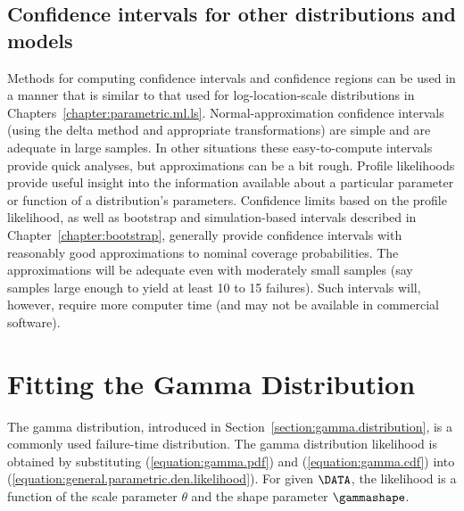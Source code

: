 \subsection{Confidence intervals for other distributions and models}
Methods for computing confidence intervals and confidence regions
can be used in a manner that is similar to that used for
log-location-scale distributions in
Chapters~\ref{chapter:parametric.ml.ls}.  Normal-approximation
confidence intervals (using the delta method and appropriate
transformations) are simple and are adequate in large samples.  In
other situations these easy-to-compute intervals provide quick
analyses, but approximations can be a bit rough. Profile likelihoods
provide useful insight into the information available about a
particular parameter or function of a distribution's parameters.
Confidence limits based on the profile likelihood, as well as
bootstrap and simulation-based intervals described in
Chapter~\ref{chapter:bootstrap}, generally provide confidence
intervals with reasonably good approximations to nominal coverage
probabilities. The approximations will be adequate even with
moderately small samples (say samples large enough to yield at least
10 to 15 failures).  Such intervals will, however, require more
computer time (and may not be available in commercial software).

\section{Fitting the Gamma Distribution}
\label{section:gamma.mle}
The gamma distribution, introduced in
Section~\ref{section:gamma.distribution}, is
a commonly used failure-time distribution.  The gamma
distribution likelihood is obtained by substituting
(\ref{equation:gamma.pdf}) and (\ref{equation:gamma.cdf}) into
(\ref{equation:general.parametric.den.likelihood}).  For given
$\DATA$, the likelihood is a function of the scale parameter $\theta$
and the shape parameter $\gammashape$.


